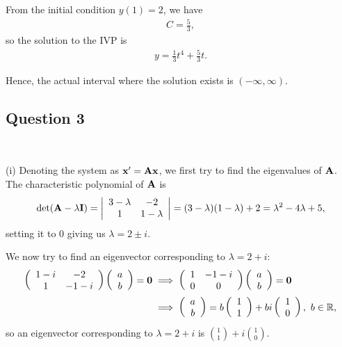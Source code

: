 \documentclass[12pt]{amsart}
\theoremstyle{plain}
\theoremstyle{definition}
\def\mb{\mathbb}
\def\bf{\textbf}
\newcommand{\RA}{\implies}
\begin{document}
From the initial condition $y(1)=2$, we have
\begin{align*}
	C=\frac53,
\end{align*}
so the solution to the IVP is
\begin{align*}
	y=\frac13t^4+\frac53t.
\end{align*}

Hence, the actual interval where the solution exists is $(-\infty,\infty)$.

\subsection*{Question 3} \ 

(i) Denoting the system as $\bf x'=\bf A\bf x$, we first try to find the eigenvalues of $\bf A$. The characteristic polynomial of $\bf A$ is
\begin{align*}
	\det(\bf A-\lambda\bf I)=\left|
	\begin{array}{cc}
		3-\lambda & -2\\
		1 & 1-\lambda
	\end{array}
	\right|=(3-\lambda)(1-\lambda)+2=\lambda^2-4\lambda+5,
\end{align*}
setting it to 0 giving us $\lambda=2\pm i$.

We now try to find an eigenvector corresponding to $\lambda=2+i$:
\begin{align*}
	\left(
	\begin{array}{cc}
		1-i & -2\\
		1 & -1-i
	\end{array}
	\right)
	\left(
	\begin{array}{cc}
		a\\
		b
	\end{array}
	\right)=\bf 0&\RA 
	\left(
	\begin{array}{cc}
		1 & -1-i\\
		0 & 0
	\end{array}
	\right)
	\left(
	\begin{array}{cc}
		a\\
		b
	\end{array}
	\right)=\bf 0\\
	&\RA \left(
	\begin{array}{cc}
		a\\
		b
	\end{array}
	\right)=b\left(
	\begin{array}{cc}
		1\\
		1
	\end{array}
	\right)+bi\left(
	\begin{array}{cc}
		1\\
		0
	\end{array}
	\right),\ b\in\mb R,
\end{align*}
so an eigenvector corresponding to $\lambda=2+i$ is $\displaystyle\binom11+i\binom 10$.
\end{document}
